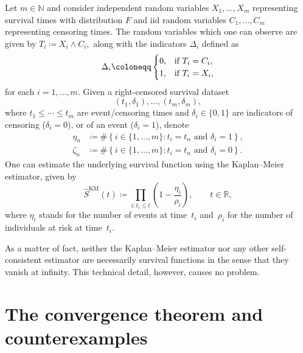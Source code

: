 \documentclass{amsart}
\theoremstyle{plain}
\theoremstyle{definition}
\def\l{\left}
\def\r{\right}
\def\as{\coloneqq}
\def\nat{\mathbb{N}}
\def\rls{\mathbb{R}}
\def\col{\colon}
\renewcommand{\hat}{\widehat}
\begin{document}
Let $m\in\nat$ and consider independent random variables $X_1,\dots,X_m$ representing survival times with distribution $F$ and iid random variables $C_1,\dots,C_m$ representing censoring times. The random variables which one can observe are given by $T_i\as X_i\wedge C_i,$ along with the indicators $\Delta_i$ defined as
\begin{equation*}
\Delta_i \as
 \begin{cases}
  0, &  \textnormal{if } T_i=C_i, \\ 
  1, &  \textnormal{if } T_i=X_i,
 \end{cases}
\end{equation*}
for each $i=1,\dots,m.$ Given a right-censored survival dataset
\begin{equation*}
 \l(t_1,\delta_1\r),\dots,\l(t_m,\delta_m\r),
\end{equation*}
where $t_1\le\cdots \le t_m$ are event/censoring times and $\delta_i\in\{0,1\}$ are  indicators of censoring ($\delta_i=0$), or of an event ($\delta_i=1$), denote
\begin{align*}
  \eta_n & \as \#\l\{i\in\{1,\dots,m\}\col t_i = t_n \text{ and } \delta_i=1  \r\} ,\\  \zeta_n & \as \#\l\{i\in\{1,\dots,m\}\col t_i = t_n \text{ and } \delta_i=0  \r\}.
\end{align*}
One can estimate the underlying survival function using the Kaplan--Meier \cite{kaplan-meier} estimator, given by
\begin{equation*}
 \hat{S}^\textrm{KM}(t)\as \prod_{i\col t_i\le t} \l(1-\frac{\eta_i}{\rho_i}\r),\qquad t\in\rls,
\end{equation*}
where $\eta_i$ stands for the number of events at time~$t_i$ and~$\rho_i$ for the number of individuals at risk at time~$t_i.$

As a matter of fact, neither the Kaplan--Meier estimator nor any other self-consistent estimator are necessarily survival functions in the sense that they vanish at infinity. This technical detail, however, causes no problem. 


\section{The convergence theorem and counterexamples}
\end{document}
